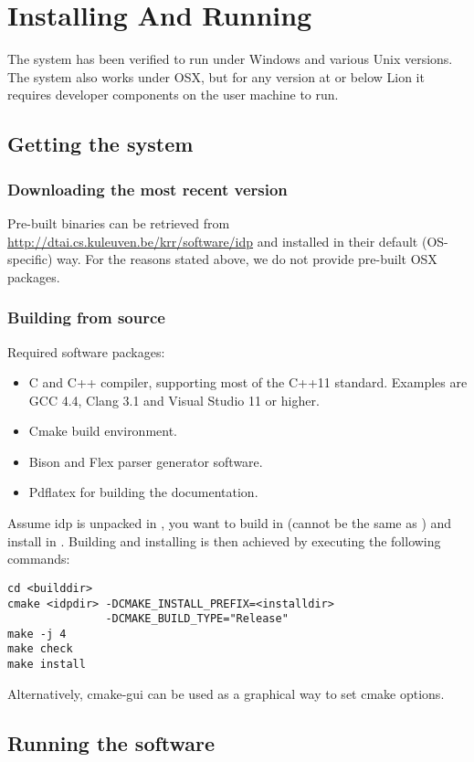 \section{Installing And Running}
The system has been verified to run under Windows and various Unix versions.
The system also works under OSX, but for any version at or below Lion it requires developer components on the user machine to run.

\subsection{Getting the system}
\subsubsection{Downloading the most recent version}
Pre-built binaries can be retrieved from \url{http://dtai.cs.kuleuven.be/krr/software/idp} and installed in their default (OS-specific) way.
For the reasons stated above, we do not provide pre-built OSX packages. 

\subsubsection{Building from source}
Required software packages:
\begin{itemize}
  \item C and C++ compiler, supporting most of the C++11 standard. Examples are GCC 4.4, Clang 3.1 and Visual Studio 11 or higher.
  \item Cmake build environment. 
  \item Bison and Flex parser generator software.
  \item Pdflatex for building the documentation.
\end{itemize}

Assume idp is unpacked in , you want to build in  (cannot be the same as ) and install in . Building and installing is then achieved by executing the following commands:
\begin{lstlisting}
cd <builddir>
cmake <idpdir> -DCMAKE_INSTALL_PREFIX=<installdir> 
               -DCMAKE_BUILD_TYPE="Release"
make -j 4
make check
make install
\end{lstlisting}

Alternatively, cmake-gui can be used as a graphical way to set cmake options.

\subsection{Running the software}
